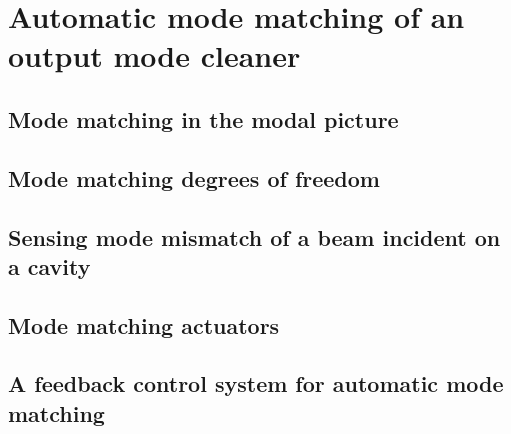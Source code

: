 \chapter{Automatic mode matching of an output mode cleaner}

\section{Mode matching in the modal picture}


\section{Mode matching degrees of freedom}


\section{Sensing mode mismatch of a beam incident on a cavity}

\section{Mode matching actuators}

\section{A feedback control system for automatic mode matching}
